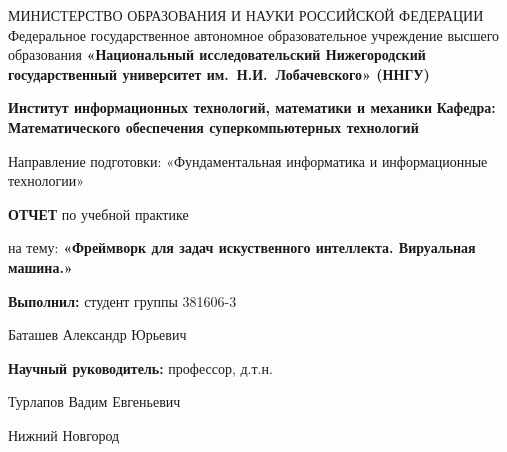 {
\begin{titlepage}
  \begin{center}
    МИНИСТЕРСТВО ОБРАЗОВАНИЯ И НАУКИ РОССИЙСКОЙ ФЕДЕРАЦИИ\break
    Федеральное государственное автономное образовательное учреждение высшего образования\break
    \textbf{«Национальный исследовательский Нижегородский государственный университет им.~Н.И.~Лобачевского» (ННГУ)}
    \break

    \vspace*{1.25cm}

    \textbf{Институт информационных технологий, математики и механики}\break
    \textbf{Кафедра: Математического обеспечения суперкомпьютерных технологий}
    \vspace{0.5cm}

    Направление подготовки: «Фундаментальная информатика и информационные технологии»\break

    \vspace{2.5cm}

    \large{\textbf{ОТЧЕТ}}\break
    по учебной практике\break

    \vspace{0.25cm}

    на тему:\break
    \large{\textbf{«Фреймворк для задач искуственного интеллекта. Вируальная машина.»}}
  \end{center}

\vspace{2cm}

\hfill\textbf{Выполнил:} студент группы 381606-3

 \hfill Баташев Александр Юрьевич

 \hfill\textbf{Научный руководитель:} профессор, д.т.н.

 \hfill Турлапов Вадим Евгеньевич
\vfill
\begin{center}
  Нижний Новгород
\end{center}
\end{titlepage}
}
